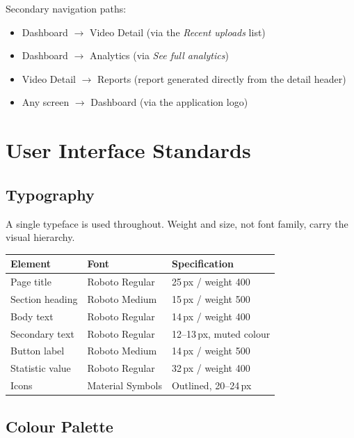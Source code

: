 \documentclass[12pt,a4paper,twoside]{article}
\begin{document}
\noindent Secondary navigation paths:

\begin{itemize}[nosep]
\item Dashboard $\rightarrow$ Video Detail (via the \emph{Recent uploads} list)
\item Dashboard $\rightarrow$ Analytics (via \emph{See full analytics})
\item Video Detail $\rightarrow$ Reports (report generated directly from the detail header)
\item Any screen $\rightarrow$ Dashboard (via the application logo)
\end{itemize}

\section{User Interface Standards}

\subsection{Typography}

A single typeface is used throughout. Weight and size, not font family, carry the
visual hierarchy.

\begin{table}[htbp]
\centering
\begin{tabular}{|p{4cm}|p{3.2cm}|p{4.4cm}|}
\hline
\textbf{Element} & \textbf{Font} & \textbf{Specification}\\
\hline
Page title & Roboto Regular & 25\,px / weight 400\\
\hline
Section heading & Roboto Medium & 15\,px / weight 500\\
\hline
Body text & Roboto Regular & 14\,px / weight 400\\
\hline
Secondary text & Roboto Regular & 12--13\,px, muted colour\\
\hline
Button label & Roboto Medium & 14\,px / weight 500\\
\hline
Statistic value & Roboto Regular & 32\,px / weight 400\\
\hline
Icons & Material Symbols & Outlined, 20--24\,px\\
\hline
\end{tabular}
\end{table}

\subsection{Colour Palette}
\end{document}

